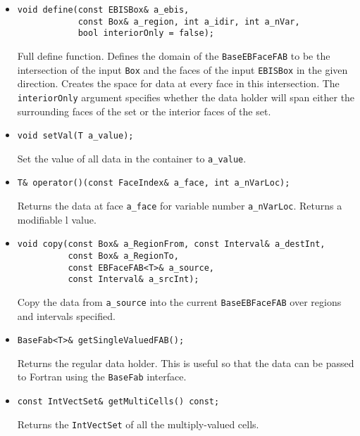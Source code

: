 \begin{itemize}

\item \begin{verbatim}
void define(const EBISBox& a_ebis,
            const Box& a_region, int a_idir, int a_nVar,
            bool interiorOnly = false);
\end{verbatim}
Full define function.  Defines the domain of the {\tt BaseEBFaceFAB}
to be the intersection of the input {\tt Box} and the 
faces of the input {\tt EBISBox} in the given direction.   
Creates the space for data at every face in this intersection.
The  {\tt interiorOnly} argument specifies whether the data holder
will span either the surrounding faces of the set or the interior
faces of the set.

\item \begin{verbatim}
void setVal(T a_value);
\end{verbatim}
Set the value of all data in the container to \verb/a_value/.

\item\begin{verbatim}
T& operator()(const FaceIndex& a_face, int a_nVarLoc);
\end{verbatim}
Returns the data at face \verb/a_face/ for variable number
\verb/a_nVarLoc/.  Returns a modifiable l value.


\item \begin{verbatim}
void copy(const Box& a_RegionFrom, const Interval& a_destInt,
          const Box& a_RegionTo,
          const EBFaceFAB<T>& a_source,
          const Interval& a_srcInt);
\end{verbatim}
Copy the data from \verb/a_source/ into the
current {\tt BaseEBFaceFAB} over regions and intervals specified.

\item \begin{verbatim}
BaseFab<T>& getSingleValuedFAB();
\end{verbatim}
Returns the regular data holder.  This is useful so
that the data can be passed to Fortran 
using the {\tt BaseFab} interface.

\item \begin{verbatim}
const IntVectSet& getMultiCells() const;
\end{verbatim}
Returns the {\tt IntVectSet}  of all the multiply-valued cells.
\end{itemize}


